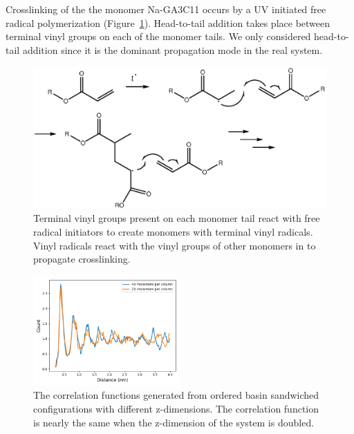\documentclass[journal=jpcbfk,manusciprt=article]{achemso}
\begin{document}
  Crosslinking of the the monomer Na-GA3C11 occurs by a UV initiated free
  radical polymerization (Figure~\ref{fig:xlink_mech}).  Head-to-tail addition
  takes place between terminal vinyl groups on each of the monomer tails.  We
  only considered head-to-tail addition since it is the dominant propagation mode
  in the real system.   

  \begin{figure}[!htb]
  \centering
  \includegraphics[width=\textwidth]{Crosslink_mechanism.eps}
  \caption{Terminal vinyl groups present on each monomer tail react with free
	  radical initiators to create monomers with terminal vinyl radicals.  Vinyl
	  radicals react with the vinyl groups of other monomers in to propagate
	  crosslinking.}\label{fig:xlink_mech}
  \end{figure}

  \begin{figure}[!htb]
  \centering
  \includegraphics[width=0.5\textwidth]{z_correlation_overlay.png}
  \caption{The correlation functions generated from ordered basin sandwiched configurations
  with different z-dimensions. The correlation function is nearly the same when the z-dimension
  of the system is doubled.}\label{fig:z_correlation_overlay}
  \end{figure}
  
\end{document}
